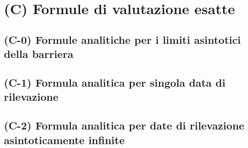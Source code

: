 \chapter{(C) Formule di valutazione esatte} \label{cap:exactformulas}

\section{(C-0) Formule analitiche per i limiti asintotici della barriera}
\lipsum[1-3]

\section{(C-1) Formula analitica per singola data di rilevazione}
\lipsum[1-3]

\section{(C-2) Formula analitica per date di rilevazione asintoticamente infinite}
\lipsum[1-3]